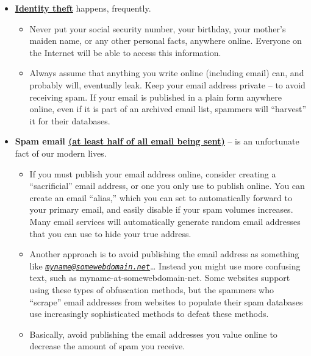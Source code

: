 \documentclass[
]{book}
\providecommand{\tightlist}{%
  \setlength{\itemsep}{0pt}\setlength{\parskip}{0pt}}
\theoremstyle{definition}
\theoremstyle{definition}
\theoremstyle{definition}
\theoremstyle{definition}
\theoremstyle{remark}
\begin{document}
\begin{itemize}
\tightlist
\item
  \href{https://en.wikipedia.org/wiki/Identity_theft}{\textbf{Identity theft}} happens, frequently.

  \begin{itemize}
  \tightlist
  \item
    Never put your social security number, your birthday, your mother's maiden name, or any other personal facts, anywhere online. Everyone on the Internet will be able to access this information.\\
  \item
    Always assume that anything you write online (including email) can, and probably will, eventually leak. Keep your email address private -- to avoid receiving spam. If your email is published in a plain form anywhere online, even if it is part of an archived email list, spammers will ``harvest'' it for their databases.\\
  \end{itemize}
\item
  \textbf{Spam email \href{https://securelist.com/spam-report-2019/96527/}{(at least half of all email being sent)}} -- is an unfortunate fact of our modern lives.

  \begin{itemize}
  \tightlist
  \item
    If you must publish your email address online, consider creating a ``sacrificial'' email address, or one you only use to publish online. You can create an email ``alias,'' which you can set to automatically forward to your primary email, and easily disable if your spam volumes increases. Many email services will automatically generate random email addresses that you can use to hide your true address.
  \item
    Another approach is to avoid publishing the email address as something like \emph{\href{mailto:myname@somewebdomain.net}{\nolinkurl{myname@somewebdomain.net}}}\ldots{} Instead you might use more confusing text, such as myname-at-somewebdomain-net. Some websites support using these types of obfuscation methods, but the spammers who ``scrape'' email addresses from websites to populate their spam databases use increasingly sophisticated methods to defeat these methods.\\
  \item
    Basically, avoid publishing the email addresses you value online to decrease the amount of spam you receive.
  \end{itemize}
\end{itemize}
\end{document}
